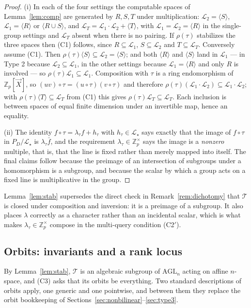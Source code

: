 \documentclass{conjura-solution}
\newcommand{\Zp}{\mathbb{Z}_p}
\newcommand{\Zpx}{\mathbb{Z}_p^{\times}}
\newcommand{\vX}{\vec{X}}
\newcommand{\LL}{\mathcal{L}}
\newcommand{\Span}[1]{\langle #1 \rangle} %
\newcommand{\AGL}{\mathrm{AGL}}
\begin{document}
\begin{proof}
(i) In each of the four settings the computable spaces of Lemma~\ref{lem:comp} are generated by
$R,S,T$ under multiplication: $\LL_2=\Span{S}$, $\LL_1=\Span{R}$ or $\Span{R\cup S}$, and
$\LL_T=\LL_1\cdot\LL_2+\Span{T}$, with $\LL_1=\LL_2=\Span{R}$ in the single-group settings and
$\LL_T$ absent when there is no pairing. If $\rho(\tau)$ stabilizes the three spaces then
\textup{(C1)} follows, since $R\subseteq\LL_1$, $S\subseteq\LL_2$ and $T\subseteq\LL_T$.
Conversely assume \textup{(C1)}. Then $\rho(\tau)\Span{S}\subseteq\LL_2=\Span{S}$; and both
$\Span{R}$ and $\Span{S}$ land in $\LL_1$ --- in Type 2 because $\LL_2\subseteq\LL_1$, in the
other settings because $\LL_1=\Span{R}$ and only $R$ is involved --- so
$\rho(\tau)\LL_1\subseteq\LL_1$. Composition with $\tau$ is a ring endomorphism of $\Zp[\vX]$,
so $(uv)\circ\tau=(u\circ\tau)(v\circ\tau)$ and therefore
$\rho(\tau)(\LL_1\cdot\LL_2)\subseteq\LL_1\cdot\LL_2$; with $\rho(\tau)\Span{T}\subseteq\LL_T$
from \textup{(C1)} this gives $\rho(\tau)\LL_T\subseteq\LL_T$. Each inclusion is between spaces
of equal finite dimension under an invertible map, hence an equality.

(ii) The identity $f\circ\tau=\lambda_\tau f+h_\tau$ with $h_\tau\in\LL_\star$ says exactly that
the image of $f\circ\tau$ in $P_D/\LL_\star$ is $\lambda_\tau\bar f$, and the requirement
$\lambda_\tau\in\Zpx$ says the image is a \emph{nonzero} multiple, that is, that the line is
fixed rather than merely mapped into itself. The final claims follow because the preimage of an
intersection of subgroups under a homomorphism is a subgroup, and because the scalar by which a
group acts on a fixed line is multiplicative in the group.
\end{proof}

Lemma~\ref{lem:stab} supersedes the direct check in Remark~\ref{rem:dichotomy} that
$\mathcal T$ is closed under composition and inversion: it is a preimage of a subgroup. It also
places $\lambda$ correctly as a character rather than an incidental scalar, which is what makes
$\lambda_\tau\in\Zpx$ compose in the multi-query condition \textup{(C2$'$)}.

\subsection{Orbits: invariants and a rank locus}

By Lemma~\ref{lem:stab}, $\mathcal T$ is an algebraic subgroup of $\AGL_n$ acting on affine
$n$-space, and \textup{(C3)} asks that its orbits be everything. Two standard descriptions of
orbits apply, one generic and one pointwise, and between them they replace the orbit
bookkeeping of Sections~\ref{sec:nonbilinear}--\ref{sec:type3}.
\end{document}
